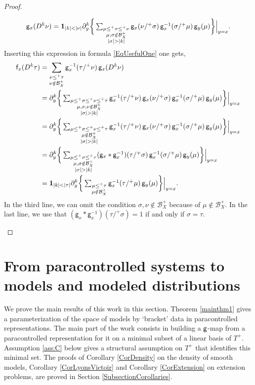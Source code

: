 \documentclass[11pt]{article}
\numberwithin{equation}{section}
\theoremstyle{plain}
\theoremstyle{definition}
\newcommand{\sff}{\mathsf{f}}
\newcommand{\sfg}{\mathsf{g}}
\newcommand{\mcB}{\mathcal{B}}
\begin{document}
\begin{proof}
\begin{itemize}
\[
\sfg_x(D^k\nu) = {\bf1}_{|k|<|\nu|}\partial_y^k \bigg\{\textstyle\sum_{\substack{\mu\le^+\sigma\le^+\nu \\ \mu,\sigma\notin\mcB_X^+\\|\sigma|>|k|}} \sfg_x(\nu/^+\sigma)\,\sfg_x^{-1}(\sigma/^+\mu)\,\sfg_y(\mu)\bigg\}\Big|_{y=x}.
\]
Inserting this expression in formula \eqref{EqUsefulOne} one gets,
\begin{align*}
\sff_x(D^k\tau)
&= \sum_{\substack{\nu\le^+\tau\\\nu\notin\mcB_X^+}} \sfg_x^{-1}(\tau/^+\nu)\,\sfg_x(D^k\nu) \\
&= \partial_y^k \bigg\{\textstyle\sum_{\substack{\mu\le^+\sigma\le^+\nu\le^+\tau \\ \mu,\sigma,\nu\notin\mcB_X^+\\|\sigma|>|k|}} \sfg_x^{-1}(\tau/^+\nu)\,\sfg_x(\nu/^+\sigma)\,\sfg_x^{-1}(\sigma/^+\mu)\,\sfg_y(\mu)\bigg\}\Big|_{y=x} \\
&= \partial_y^k \bigg\{\textstyle\sum_{\substack{\mu\le^+\sigma\le^+\nu\le^+\tau \\ \mu\notin\mcB_X^+\\|\sigma|>|k|}} \sfg_x^{-1}(\tau/^+\nu)\,\sfg_x(\nu/^+\sigma)\,\sfg_x^{-1}(\sigma/^+\mu)\,\sfg_y(\mu)\bigg\}\Big|_{y=x} \\
&= \partial_y^k \bigg\{\textstyle\sum_{\substack{\mu\le^+\sigma\le^+\tau \\ \mu,\sigma\notin\mcB_X^+\\|\sigma|>|k|}} (\sfg_x*\sfg_x^{-1})(\tau/^+\sigma)\,\sfg_x^{-1}(\sigma/^+\mu)\,\sfg_y(\mu)\bigg\}\Big|_{y=x} \\
&= {\bf1}_{|k|<|\tau|}\partial_y^k \bigg\{\textstyle\sum_{\substack{\mu\le^+\tau\\ \mu\notin\mcB_X^+}}\sfg_x^{-1}(\tau/^+\mu)\,\sfg_y(\mu)\bigg\}\Big|_{y=x}.
\end{align*}
In the third line, we can omit the condition $\sigma,\nu\notin\mcB_X^+$ because of $\mu\notin\mcB_X^+$.
In the last line, we use that $(\sfg_x*\sfg_x^{-1})(\tau/^+\sigma)=1$ if and only if $\sigma=\tau$.\qedhere
\end{itemize}
\end{proof}

\section{From paracontrolled systems to models and modeled distributions}
\label{SectionPCtoRS}

We prove the main results of this work in this section. Theorem \ref{mainthm1} gives a parameterization of the space of models by `bracket' data in paracontrolled representations. The main part of the work consists in building a $\sf g$-map from a paracontrolled representation for it on a minimal subset of a linear basis of $T^+$. Assumption \eqref{ass:C} below gives a structural assumption on $T^+$ that identifies this minimal set. The proofs of Corollary \ref{CorDensity} on the density of smooth models, Corollary \ref{CorLyonsVictoir} and Corollary \ref{CorExtension} on extension problems, are proved in Section \ref{SubsectionCorollaries}.
\end{document}
